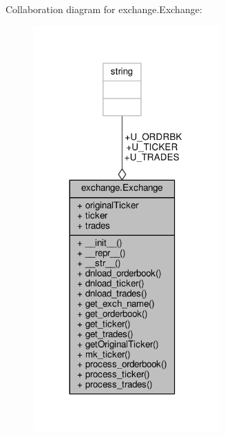 Collaboration diagram for exchange.\+Exchange\+:\nopagebreak
\begin{figure}[H]
\begin{center}
\leavevmode
\includegraphics[width=203pt]{classexchange_1_1_exchange__coll__graph}
\end{center}
\end{figure}
